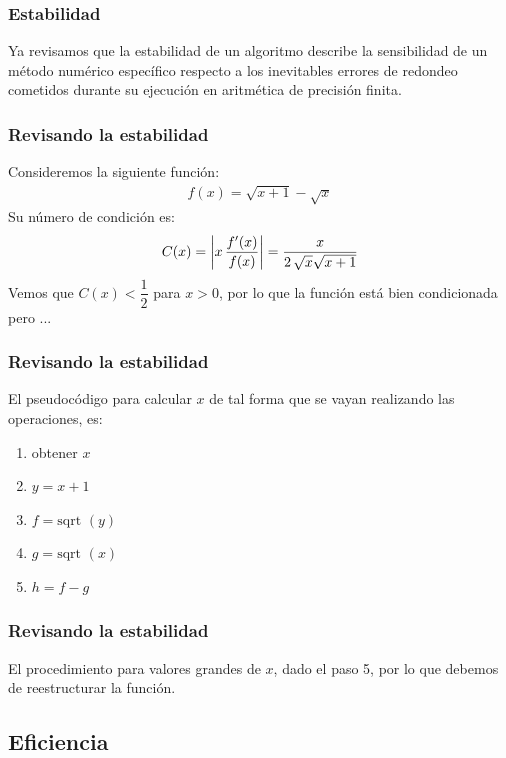 \documentclass[12pt]{beamer}
\begin{document}
\begin{frame}
\frametitle{Estabilidad}
Ya revisamos que la estabilidad de un algoritmo describe la sensibilidad de un método numérico específico
respecto a los inevitables errores de redondeo cometidos durante su ejecución en aritmética de precisión finita.
\end{frame}
\begin{frame}
\frametitle{Revisando la estabilidad}
Consideremos la siguiente función:
\begin{align*}
f (x) = \sqrt{x + 1} - \sqrt{x}
\end{align*}
\pause
Su número de condición es:
\pause
\begin{align*}
C (x) = \abs{ x \, \dfrac{{f}^{\prime} (x)}{f(x)} } = \dfrac{x}{2 \, \sqrt{x} \sqrt{x+1}}
\end{align*}
\pause
Vemos que $C (x) < \dfrac{1}{2}$ para $x > 0$, por lo que la función está bien condicionada pero ...
\end{frame}
\begin{frame}
\frametitle{Revisando la estabilidad}
El pseudocódigo para calcular $x$ de tal forma que se vayan realizando las operaciones, es:
\pause
{}
\begin{enumerate}[<+->]
\item obtener $x$
\item $y = x + 1$
\item $f = \text{sqrt } (y)$
\item $g = \text{sqrt } (x)$
\item $h = f - g$
\end{enumerate}
\end{frame}
\begin{frame}
\frametitle{Revisando la estabilidad}	
El procedimiento  para valores grandes de $x$, dado el paso 5, por lo que debemos de reestructurar la función.
\end{frame}

\subsection{Eficiencia}
\end{document}
